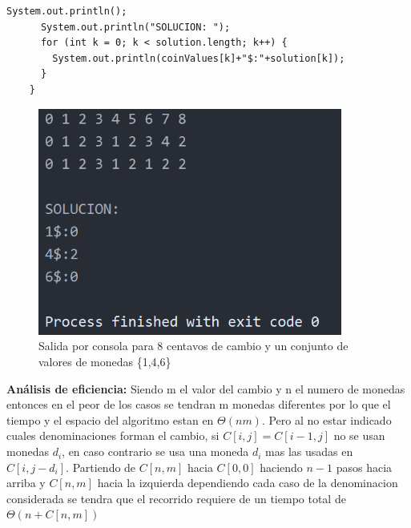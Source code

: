 \begin{lstlisting}[style=java,caption= Problema del cambio]
      System.out.println();
      System.out.println("SOLUCION: ");
      for (int k = 0; k < solution.length; k++) {
        System.out.println(coinValues[k]+"$:"+solution[k]);
      }
    }
\end{lstlisting}

\begin{figure}[!htb]
  \centering
  \includegraphics[width=10cm, scale=1]{Images/Punto2/Salida.png}
  \caption{Salida por consola para 8 centavos de cambio y un conjunto de valores de monedas \{1,4,6\}}
\end{figure}

\textbf{Análisis de eficiencia: }Siendo m el valor del cambio y n el numero de monedas entonces en el peor de los casos se tendran m monedas diferentes por lo que el tiempo y el espacio del algoritmo estan en $\Theta(nm)$. Pero al no estar indicado cuales denominaciones forman el cambio, si $C[i,j]=C[i-1,j]$ no se usan monedas $d_i$, en caso contrario se usa una moneda $d_i$ mas las usadas en $C[i,j-d_i]$. Partiendo de $C[n,m]$ hacia $C[0,0]$ haciendo $n-1$ pasos hacia arriba y $C[n,m]$ hacia la izquierda dependiendo cada caso de la denominacion considerada se tendra que el recorrido requiere de un tiempo total de $\Theta(n+C[n,m])$